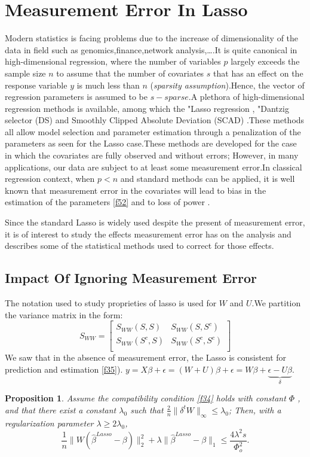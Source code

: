 \documentclass[12pt]{report}
\newtheorem {proposition}{Proposition}[section]  %
\begin{document}
\section{Measurement Error In Lasso}
Modern  statistics is facing problems due to the increase of dimensionality of the data in field such as genomics,finance,network analysis,\dots .It is quite canonical in high-dimensional regression, where the number of variables $p$  largely exceeds the sample size $n$ to assume that the number of covariates $s$ that has an effect on the response variable $y$ is much less than $n$ (\textit{sparsity assumption}).Hence, the vector of regression parameters is assumed to be $s-sparse$.A plethora of high-dimensional regression methods is available, among which the "Lasso regression \cite{nref9}, "Dantzig selector (DS) \cite{nref2} and Smoothly Clipped Absolute Deviation (SCAD) \cite{nref3}.These methods all allow model selection and parameter estimation through a penalization of the parameters as seen for the Lasso case.These methods are developed for the case in which the covariates are fully observed and without errors; However, in many applications, our data are subject to at least some measurement error.In classical regression context, when $p<n$ and standard methods can be applied, it is well known that measurement error in the covariates will lead to bias in the estimation of the parameters \eqref{f52} and to loss of power \cite{nref5}.

Since the standard Lasso is widely used despite the present of measurement error, it is of interest to study the effects measurement error has on the analysis and describes some of the statistical methods used to correct for those effects.
\subsection{Impact Of Ignoring Measurement Error}
The notation used to study proprieties of lasso is used for $W$ and $U$.We partition the variance matrix in the form:
\begin{equation}
	S_{WW}=\begin{bmatrix}
		S_{WW}(S,S)& S_{WW}(S,S^{c}) \\
		S_{WW}(S^{c},S) & S_{WW}(S^{c},S^{c}) \\
	\end{bmatrix}
\end{equation}
We saw that in the absence of measurement error, the Lasso is consistent for prediction and estimation \eqref{f35}).
$y=X\beta +\epsilon=(W+U)\beta+\epsilon=W\beta+ \underbrace{\epsilon-U\beta}_{\delta}$.
\begin{proposition}
	Assume the compatibility condition  \eqref{f34} holds with constant $\Phi$ , and that there exist a constant $\lambda_{0}$ such that  $\frac{2}{n}\parallel\delta^{t}W\parallel_{\infty}\leq \lambda_{0}$; Then, with a regularization parameter $\lambda \geq 2\lambda_{0}$,
	\begin{equation}
		\frac{1}{n}\parallel W(\hat{\beta}^{Lasso}-\beta )\parallel^{2}_{2}+  \lambda\parallel \hat{\beta}^{Lasso}-\beta \parallel_{1}\leq \frac{4 \lambda^{2}s}{\Phi_{o}^{2}}.
		\label{f61}
	\end{equation}
\end{proposition}
\end{document}
